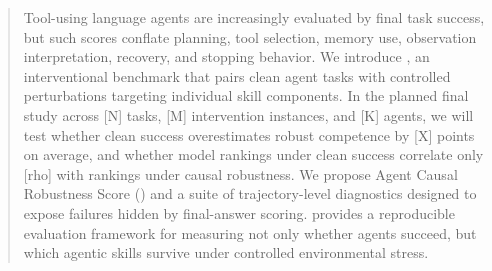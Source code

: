 \begin{abstract}
Tool-using language agents are increasingly evaluated by final task success, but such scores conflate planning, tool selection, memory use, observation interpretation, recovery, and stopping behavior. We introduce \benchmark, an interventional benchmark that pairs clean agent tasks with controlled perturbations targeting individual skill components. In the planned final study across [N] tasks, [M] intervention instances, and [K] agents, we will test whether clean success overestimates robust competence by [X] points on average, and whether model rankings under clean success correlate only [rho] with rankings under causal robustness. We propose Agent Causal Robustness Score (\acrs) and a suite of trajectory-level diagnostics designed to expose failures hidden by final-answer scoring. \benchmark provides a reproducible evaluation framework for measuring not only whether agents succeed, but which agentic skills survive under controlled environmental stress.
\end{abstract}
